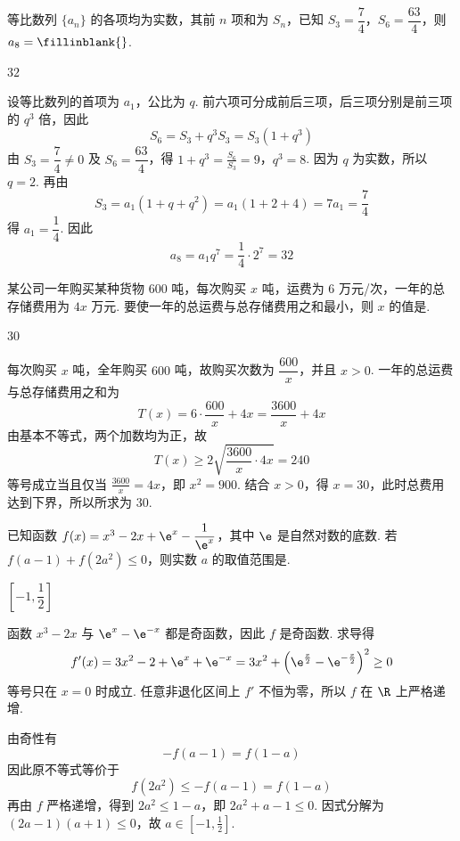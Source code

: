 \begin{problem}
等比数列 \(\{a_n\}\) 的各项均为实数，其前 \(n\) 项和为 \(S_n\)，已知 \(S_3=\dfrac74\)，\(S_6=\dfrac{63}{4}\)，则 \(a_8=\fillinblank{}\).
\end{problem}

\begin{answer}
\(32\)
\end{answer}

\begin{solution}
设等比数列的首项为 \(a_1\)，公比为 \(q\). 前六项可分成前后三项，后三项分别是前三项的 \(q^3\) 倍，因此
\[
S_6=S_3+q^3S_3=S_3(1+q^3)
\]
由 \(S_3=\dfrac74\ne0\) 及 \(S_6=\dfrac{63}{4}\)，得
\(1+q^3=\frac{S_6}{S_3}=9\)，\(q^3=8\).
因为 \(q\) 为实数，所以 \(q=2\). 再由
\[
S_3=a_1(1+q+q^2)=a_1(1+2+4)=7a_1=\frac74
\]
得 \(a_1=\dfrac14\). 因此
\[
a_8=a_1q^7=\frac14\cdot2^7=32
\]
\end{solution}



\begin{problem}
某公司一年购买某种货物 \(600\) 吨，每次购买 \(x\) 吨，运费为 \(6\) 万元/次，一年的总存储费用为 \(4x\) 万元. 要使一年的总运费与总存储费用之和最小，则 \(x\) 的值是\fillinblank{}.
\end{problem}

\begin{answer}
\(30\)
\end{answer}

\begin{solution}
每次购买 \(x\) 吨，全年购买 \(600\) 吨，故购买次数为 \(\dfrac{600}{x}\)，并且 \(x>0\). 一年的总运费与总存储费用之和为
\[
T(x)=6\cdot\frac{600}{x}+4x=\frac{3600}{x}+4x
\]
由基本不等式，两个加数均为正，故
\[
T(x)\ge2\sqrt{\frac{3600}{x}\cdot4x}=240
\]
等号成立当且仅当 \(\frac{3600}{x}=4x\)，即 \(x^2=900\). 结合 \(x>0\)，得 \(x=30\)，此时总费用达到下界，所以所求为 \(30\).
\end{solution}



\begin{problem}
已知函数 \(f(x)=x^3-2x+\e^x-\dfrac{1}{\e^x}\)，其中 \(\e\) 是自然对数的底数. 若 \(f(a-1)+f(2a^2)\le 0\)，则实数 \(a\) 的取值范围是\fillinblank{}.
\end{problem}

\begin{answer}
\(\left[-1,\dfrac12\right]\)
\end{answer}

\begin{solution}
函数 \(x^3-2x\) 与 \(\e^x-\e^{-x}\) 都是奇函数，因此 \(f\) 是奇函数. 求导得
\[
f'(x)=3x^2-2+\e^x+\e^{-x}=3x^2+\left(\e^{\frac{x}{2}}-\e^{-\frac{x}{2}}\right)^2\ge0
\]
等号只在 \(x=0\) 时成立. 任意非退化区间上 \(f'\) 不恒为零，所以 \(f\) 在 \(\R\) 上严格递增.

由奇性有
\[
-f(a-1)=f(1-a)
\]
因此原不等式等价于
\[
f(2a^2)\le -f(a-1)=f(1-a)
\]
再由 \(f\) 严格递增，得到 \(2a^2\le1-a\)，即 \(2a^2+a-1\le0\). 因式分解为 \((2a-1)(a+1)\le0\)，故 \(a\in\left[-1,\frac12\right]\).
\end{solution}



